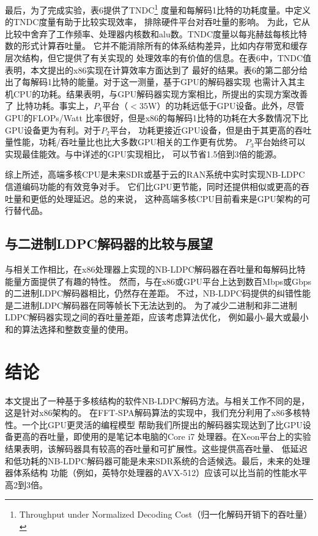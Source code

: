 \documentclass{cjc}
\begin{document}
  最后，为了完成实验，表6提供了TNDC\footnote{Throughput under Normalized Decoding Cost（归一化解码开销下的吞吐量）\cite{noauthor_ying_nodate}}
  度量和每解码1比特的功耗度量。\cite{noauthor_ying_nodate}中定义的TNDC度量有助于比较实现效率，
  排除硬件平台对吞吐量的影响\cite{gal_high-throughput_2016,noauthor_cassagne_nodate,noauthor_ying_nodate,gal_high_2014,noauthor_peng_nodate}。
  为此，它从比较中舍弃了工作频率、处理器内核数和alu数。TNDC度量以每兆赫兹每核比特数的形式计算吞吐量。
  它并不能消除所有的体系结构差异，比如内存带宽和缓存层次结构，但它提供了有关实现的
  处理效率的有价值的信息。在表6中，TNDC值表明，本文提出的x86实现在计算效率方面达到了
  最好的结果。表6的第二部分给出了每解码1比特的能量。对于这一测量，基于GPU的解码器实现
  也需计入其主机CPU的功耗。结果表明，与GPU解码器实现方案相比，所提出的实现方案改善了
  比特功耗。事实上，$P_1$平台（$<35$W）的功耗远低于GPU设备。此外，尽管GPU的FLOPs/Watt
  比率很好，但是x86的每解码1比特的功耗在大多数情况下比GPU设备更为有利。对于$P_2$平台，
  功耗更接近GPU设备，但是由于其更高的吞吐量性能，功耗/吞吐量比也比大多数GPU相关的工作更有优势。
  $P_3$平台始终可以实现最佳能效。与\cite{liu_high-throughput_2018}中详述的GPU实现相比，
  可以节省1.5倍到3倍的能源。

  综上所述，高端多核CPU是未来SDR或基于云的RAN系统中实时实现NB-LDPC信道编码功能的有效竞争对手。
  它们比GPU更节能，同时还提供相似或更高的吞吐量和更低的处理延迟。总的来说，
  这种高端多核CPU目前看来是GPU架构的可行替代品。

\subsection{与二进制LDPC解码器的比较与展望}

  与相关工作相比，在x86处理器上实现的NB-LDPC解码器在吞吐量和每解码比特能量方面提供了有趣的特性。
  然而，与在x86或GPU平台上达到数百Mbps或Gbps的二进制LDPC解码器相比，仍然存在差距。
  不过，NB-LDPC码提供的纠错性能是二进制LDPC解码器在同等帧长下无法达到的。
  为了减少二进制和非二进制LDPC解码器实现之间的吞吐量差距，应该考虑算法优化，
  例如最小-最大或最小和的算法选择和整数变量的使用。

\section{结论}
  本文提出了一种基于多核结构的软件NB-LDPC解码方法。与相关工作不同的是，这是针对x86架构的。
  在FFT-SPA解码算法的实现中，我们充分利用了x86多核特性。一个比GPU更灵活的编程模型
  帮助我们所提出的解码器实现达到了比GPU设备更高的吞吐量，即使用的是笔记本电脑的Core i7
  处理器。在Xeon平台上的实验结果表明，该解码器具有较高的吞吐量和可扩展性。这些提供高吞吐量、
  低延迟和低功耗的NB-LDPC解码器可能是未来SDR系统的合适候选。最后，未来的处理器体系结构
  功能（例如，英特尔处理器的AVX-512）应该可以比当前的性能水平高2到3倍。
\end{document}
